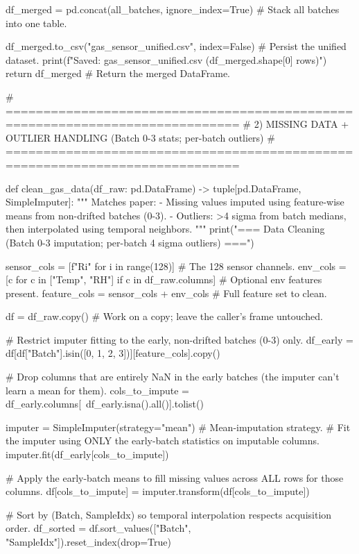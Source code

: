     df_merged = pd.concat(all_batches, ignore_index=True)  # Stack all batches into one table.

    df_merged.to_csv("gas_sensor_unified.csv", index=False)  # Persist the unified dataset.
    print(f"Saved: gas_sensor_unified.csv ({df_merged.shape[0]} rows)")
    return df_merged                       # Return the merged DataFrame.

# =============================================================================
# 2) MISSING DATA + OUTLIER HANDLING (Batch 0-3 stats; per-batch outliers)
# =============================================================================

def clean_gas_data(df_raw: pd.DataFrame) -> tuple[pd.DataFrame, SimpleImputer]:
    """
    Matches paper:
    - Missing values imputed using feature-wise means from non-drifted batches (0-3).
    - Outliers: >4 sigma from batch medians, then interpolated using temporal neighbors.
    """
    print("\n=== Data Cleaning (Batch 0-3 imputation; per-batch 4 sigma outliers) ===")

    sensor_cols = [f"R{i}" for i in range(128)]              # The 128 sensor channels.
    env_cols = [c for c in ["Temp", "RH"] if c in df_raw.columns]  # Optional env features present.
    feature_cols = sensor_cols + env_cols                   # Full feature set to clean.

    df = df_raw.copy()                     # Work on a copy; leave the caller's frame untouched.

    # Restrict imputer fitting to the early, non-drifted batches (0-3) only.
    df_early = df[df["Batch"].isin([0, 1, 2, 3])][feature_cols].copy()

    # Drop columns that are entirely NaN in the early batches (the imputer can't learn a mean for them).
    cols_to_impute = df_early.columns[~df_early.isna().all()].tolist()

    imputer = SimpleImputer(strategy="mean")  # Mean-imputation strategy.
    # Fit the imputer using ONLY the early-batch statistics on imputable columns.
    imputer.fit(df_early[cols_to_impute])

    # Apply the early-batch means to fill missing values across ALL rows for those columns.
    df[cols_to_impute] = imputer.transform(df[cols_to_impute])

    # Sort by (Batch, SampleIdx) so temporal interpolation respects acquisition order.
    df_sorted = df.sort_values(["Batch", "SampleIdx"]).reset_index(drop=True)

